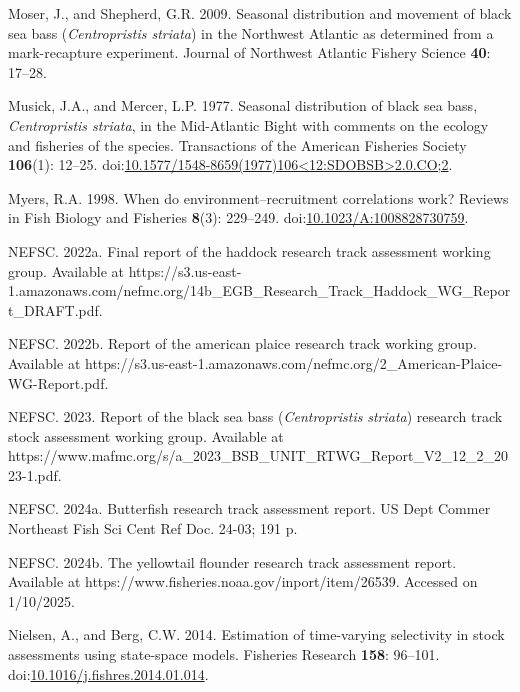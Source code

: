 \begin{CSLReferences}{1}{0}
\leavevmode{}%
Moser, J., and Shepherd, G.R. 2009. Seasonal distribution and movement of black sea bass (\emph{{C}entropristis striata}) in the {N}orthwest {A}tlantic as determined from a mark-recapture experiment. Journal of Northwest Atlantic Fishery Science \textbf{40}: 17--28.

\leavevmode{}%
Musick, J.A., and Mercer, L.P. 1977. Seasonal distribution of black sea bass, \emph{{C}entropristis striata}, in the {M}id-{A}tlantic {B}ight with comments on the ecology and fisheries of the species. Transactions of the American Fisheries Society \textbf{106}(1): 12--25. doi:\href{https://doi.org/10.1577/1548-8659(1977)106\%3C12:SDOBSB\%3E2.0.CO;2}{10.1577/1548-8659(1977)106\textless12:SDOBSB\textgreater2.0.CO;2}.

\leavevmode{}%
Myers, R.A. 1998. When do environment--recruitment correlations work? Reviews in Fish Biology and Fisheries \textbf{8}(3): 229--249. doi:\href{https://doi.org/10.1023/A:1008828730759}{10.1023/A:1008828730759}.

\leavevmode{}%
NEFSC. 2022a. Final report of the haddock research track assessment working group. {Available} at https://s3.us-east-1.amazonaws.com/nefmc.org/14b\_EGB\_Research\_Track\_Haddock\_WG\_Report\_DRAFT.pdf.

\leavevmode{}%
NEFSC. 2022b. Report of the american plaice research track working group. {Available} at https://s3.us-east-1.amazonaws.com/nefmc.org/2\_American-Plaice-WG-Report.pdf.

\leavevmode{}%
NEFSC. 2023. Report of the black sea bass (\emph{{C}entropristis} \emph{striata}) research track stock assessment working group. {Available} at https://www.mafmc.org/s/a\_2023\_BSB\_UNIT\_RTWG\_Report\_V2\_12\_2\_2023-1.pdf.

\leavevmode{}%
NEFSC. 2024a. Butterfish research track assessment report. US Dept Commer Northeast Fish Sci Cent Ref Doc. 24-03; 191 p.

\leavevmode{}%
NEFSC. 2024b. The yellowtail flounder research track assessment report. {Available} at https://www.fisheries.noaa.gov/inport/item/26539. Accessed on 1/10/2025.

\leavevmode{}%
Nielsen, A., and Berg, C.W. 2014. Estimation of time-varying selectivity in stock assessments using state-space models. Fisheries Research \textbf{158}: 96--101. doi:\href{https://doi.org/10.1016/j.fishres.2014.01.014}{10.1016/j.fishres.2014.01.014}.


\end{CSLReferences}
